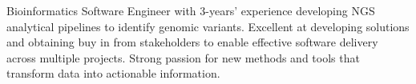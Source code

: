 

\begin{cvparagraph}

Bioinformatics Software Engineer with 3-years’ experience developing NGS analytical pipelines to identify genomic variants. Excellent at developing solutions and obtaining buy in from stakeholders to enable effective software delivery across multiple projects. Strong passion for new methods and tools that transform data into actionable information.

\end{cvparagraph}
